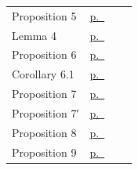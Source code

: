 \begin{center}
\begin{longtable}{@{}L{0.62\linewidth}l@{}}
Proposition 5 & \hyperref[pB-res-proposition-5]{p.~\pageref{pB-res-proposition-5}} \\
Lemma 4 & \hyperref[pB-res-lemma-4]{p.~\pageref{pB-res-lemma-4}} \\
Proposition 6 & \hyperref[pB-res-proposition-6]{p.~\pageref{pB-res-proposition-6}} \\
Corollary 6.1 & \hyperref[pB-res-corollary-6.1]{p.~\pageref{pB-res-corollary-6.1}} \\
Proposition 7 & \hyperref[pB-res-proposition-7]{p.~\pageref{pB-res-proposition-7}} \\
Proposition 7′ & \hyperref[pB-res-proposition-7p]{p.~\pageref{pB-res-proposition-7p}} \\
Proposition 8 & \hyperref[pB-res-proposition-8]{p.~\pageref{pB-res-proposition-8}} \\
Proposition 9 & \hyperref[pB-res-proposition-9]{p.~\pageref{pB-res-proposition-9}} \\
\bottomrule
\end{longtable}
\end{center}
